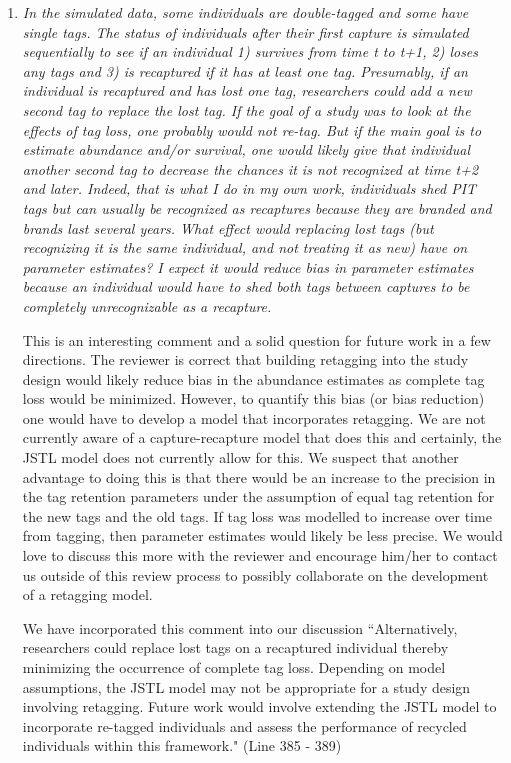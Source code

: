 \documentclass[12pt]{article}
\begin{document}
\begin{enumerate}
\item {\it In the simulated data, some individuals are double-tagged and some have single tags. The status of individuals after their first capture is simulated sequentially to see if an individual 1) survives from time t to t+1, 2) loses any tags and 3) is recaptured if it has at least one tag. Presumably, if an individual is recaptured and has lost one tag, researchers could add a new second tag to replace the lost tag. If the goal of a study was to look at the effects of tag loss, one probably would not re-tag. But if the main goal is to estimate abundance and/or survival, one would likely give that individual another second tag to decrease the chances it is not recognized at time t+2 and later. Indeed, that is what I do in my own work, individuals shed PIT tags but can usually be recognized as recaptures because they are branded and brands last several years. What effect would replacing lost tags (but recognizing it is the same individual, and not treating it as new) have on parameter estimates? I expect it would reduce bias in parameter estimates because an individual would have to shed both tags between captures to be completely unrecognizable as a recapture.}

This is an interesting comment and a solid question for future work in a few directions.  The reviewer is correct that building retagging into the study design would likely reduce bias in the abundance estimates as complete tag loss would be minimized.  However, to quantify this bias (or bias reduction) one would have to develop a model that incorporates retagging. We are not currently aware of a capture-recapture model that does this and certainly, the JSTL model does not currently allow for this.  We suspect that another advantage to doing this is that there would be an increase to the precision in the tag retention parameters under the assumption of equal tag retention for the new tags and the old tags.  If tag loss was modelled to increase over time from tagging, then parameter estimates would likely be less precise. We would love to discuss this more with the reviewer and encourage him/her to contact us outside of this review process to possibly collaborate on the development of a retagging model.

We have incorporated this comment into our discussion ``Alternatively, researchers could replace lost tags on a recaptured individual thereby minimizing the occurrence of complete tag loss.  Depending on model assumptions, the JSTL model may not be appropriate for a study design involving retagging.  Future work would involve extending the JSTL model to  incorporate re-tagged individuals and assess the performance of recycled individuals within this framework." (Line 385 - 389)


\end{enumerate}
\end{document}
